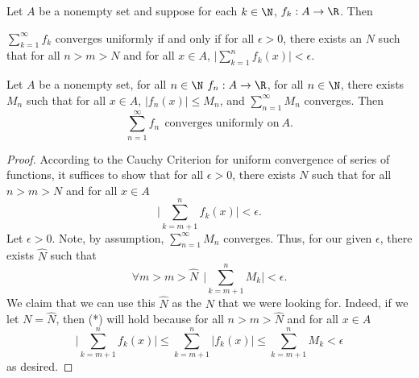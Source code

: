 \begin{theorem}
    Let \( A  \) be a nonempty set and suppose for each \( k \in \N  \), \( {f}_{k } : A \to \R  \). Then
    \begin{center}
        \( \displaystyle \sum_{ k=1  }^{ \infty  } {f}_{k } \) converges uniformly if and only if for all \(  \epsilon > 0  \), there exists an \( N  \) such that for all \( n > m > N  \) and for all \( x \in A  \), \( \displaystyle \Big| \sum_{ k=1  }^{ n } {f}_{k } (x) \Big| < \epsilon \).
    \end{center}
\end{theorem}

\begin{theorem}
    Let \( A  \) be a nonempty set, for all \( n \in \N  \) \( {f}_{n} : A \to \R  \), for all \(  n \in \N  \), there exists \( {M}_{n} \) such that for all \( x \in A  \), \( | {f}_{n}(x) |  \leq {M}_{n} \), and \( \displaystyle \sum_{ n=1  }^{ \infty  } {M}_{n}  \) converges. Then 
    \[  \sum_{ n=1  }^{ \infty  } {f}_{n} \ \ \text{converges uniformly on} \ A.  \]
\end{theorem}
\begin{proof}
    According to the Cauchy Criterion for uniform convergence of series of functions, it suffices to show that for all \( \epsilon > 0  \), there exists \( N  \) such that for all \( n > m > N  \)  and for all \( x \in A  \)
    \[  \Big| \sum_{ k=m+1  }^{ n  } {f}_{k } (x) \Big|  < \epsilon. \tag{*} \]
    Let \( \epsilon > 0 \).
    Note, by assumption, \( \displaystyle \sum_{ n=1  }^{ \infty  } {M}_{n} \) converges. Thus, for our given \( \epsilon  \), there exists \( \hat{N} \) such that 
    \[  \forall m > m > \hat{N} \ \ \Big| \sum_{ k = m + 1  }^{ n } {M}_{k }  \Big|  < \epsilon. \]
    We claim that we can use this \( \hat{N} \) as the \( N  \) that we were looking for. Indeed, if we let \( N = \hat{N} \), then (*) will hold because for all \( n > m > \hat{N} \) and for all \( x \in A  \)
    \[ \Big| \sum_{ k= m+1 }^{  n  } {f}_{k }(x) \Big|  \leq \sum_{ k = m + 1  }^{ n } | {f}_{k }(x) | \leq \sum_{ k= m + 1  }^{ n } {M}_{k } < \epsilon  \]
    as desired.
\end{proof}





